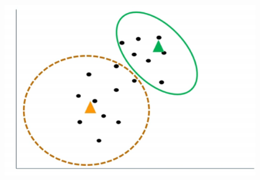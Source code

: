 \documentclass[10pt]{beamer}
\begin{document}
\begin{frame}
\begin{columns}
\begin{column}{.5\textwidth}
 \begin{figure}
 \includegraphics[scale=0.25]{./Figures/centroids_static.png} 
 \end{figure}  
\end{column}%

\end{columns}

\end{frame}
\end{document}
